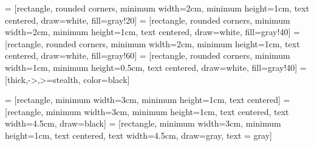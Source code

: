 


 = [rectangle, rounded corners, minimum width=2cm, minimum height=1cm, text centered, draw=white, fill=gray!20]
 = [rectangle, rounded corners, minimum width=2cm, minimum height=1cm, text centered, draw=white, fill=gray!40]
 = [rectangle, rounded corners, minimum width=2cm, minimum height=1cm, text centered, draw=white, fill=gray!60]
 = [rectangle, rounded corners, minimum width=1cm, minimum height=0.5cm, text centered, draw=white, fill=gray!40]
 = [thick,->,>=stealth, color=black]
\def\dis{4cm}


 = [rectangle, minimum width=3cm, minimum height=1cm, text centered]
 = [rectangle, minimum width=3cm, minimum height=1cm, text centered, text width=4.5cm, draw=black]
 = [rectangle, minimum width=3cm, minimum height=1cm, text centered, text width=4.5cm, draw=gray, text = gray]






